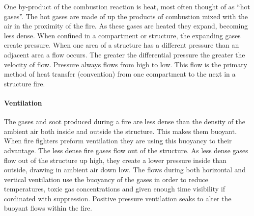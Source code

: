 \documentclass{article}
\begin{document}
One by-product of the combustion reaction is heat, most often thought of as ``hot gases''. The hot gases are made of up the products of combustion mixed with the air in the proximity of the fire. As these gases are heated they expand, becoming less dense. When confined in a compartment or structure, the expanding gases create pressure. When one area of a structure has a different pressure than an adjacent area a flow occurs. The greater the differential pressure the greater the velocity of flow. Pressure always flows from high to low. This flow is the primary method of heat transfer (convention) from one compartment to the next in a structure fire. 

\paragraph{Ventilation} \mbox{}

The gases and soot produced during a fire are less dense than the density of the ambient air both inside and outside the structure. This makes them buoyant. When fire fighters preform ventilation they are using this buoyancy to their advantage. The less dense fire gases flow out of the structure. As less dense gases flow out of the structure up high, they create a lower pressure inside than outside, drawing in ambient air down low. The flows during both horizontal and vertical ventilation use the buoyancy of the gases in order to reduce temperatures, toxic gas concentrations and given enough time visibility if cordinated with suppression. Positive pressure ventilation seaks to alter the buoyant flows within the fire. 
\end{document}
